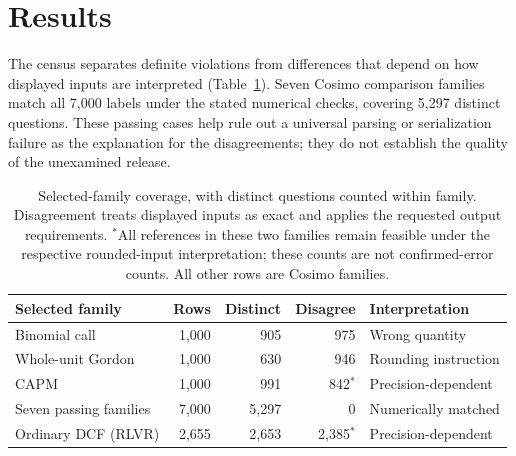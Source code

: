 \section{Results}
The census separates definite violations from differences that depend on how displayed inputs are interpreted (Table~\ref{tab:audit-overview}). Seven Cosimo comparison families match all 7,000 labels under the stated numerical checks, covering 5,297 distinct questions. These passing cases help rule out a universal parsing or serialization failure as the explanation for the disagreements; they do not establish the quality of the unexamined release.

\begin{table}[!ht]
\centering\small
\begin{tabular}{@{}p{.28\linewidth}rrrp{.27\linewidth}@{}}
\toprule
Selected family & Rows & Distinct & Disagree & Interpretation\\
\midrule
Binomial call & 1,000 & 905 & 975 & Wrong quantity\\
Whole-unit Gordon & 1,000 & 630 & 946 & Rounding instruction\\
CAPM & 1,000 & 991 & 842$^{*}$ & Precision-dependent\\
Seven passing families & 7,000 & 5,297 & 0 & Numerically matched\\
Ordinary DCF (RLVR) & 2,655 & 2,653 & 2,385$^{*}$ & Precision-dependent\\
\bottomrule
\end{tabular}
\caption{Selected-family coverage, with distinct questions counted within family. Disagreement treats displayed inputs as exact and applies the requested output requirements. $^{*}$All references in these two families remain feasible under the respective rounded-input interpretation; these counts are not confirmed-error counts. All other rows are Cosimo families.}
\label{tab:audit-overview}
\end{table}
\FloatBarrier

